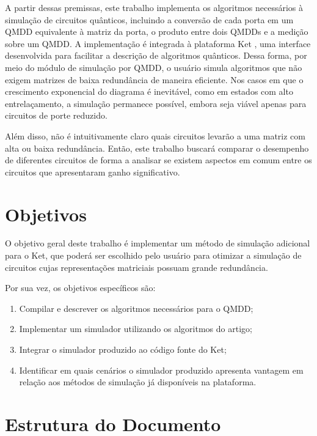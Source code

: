 A partir dessas premissas, este trabalho implementa os algoritmos necessários à simulação de circuitos quânticos, incluindo a conversão de cada porta em um QMDD equivalente à matriz da porta, o produto entre dois QMDDs e a medição sobre um QMDD. A implementação é integrada à plataforma Ket \cite{evandro}, uma interface desenvolvida para facilitar a descrição de algoritmos quânticos. Dessa forma, por meio do módulo de simulação por QMDD, o usuário simula algoritmos que não exigem matrizes de baixa redundância de maneira eficiente. Nos casos em que o crescimento exponencial do diagrama é inevitável, como em estados com alto entrelaçamento, a simulação permanece possível, embora seja viável apenas para circuitos de porte reduzido.

Além disso, não é intuitivamente claro quais circuitos levarão a uma matriz com alta ou baixa redundância. Então, este trabalho buscará comparar o desempenho de diferentes circuitos de forma a analisar se existem aspectos em comum entre os circuitos que apresentaram ganho significativo.

\section{Objetivos}

O objetivo geral deste trabalho é implementar um método de simulação adicional para o Ket, que poderá ser escolhido pelo usuário para otimizar a simulação de circuitos cujas representações matriciais possuam grande redundância.

Por sua vez, os objetivos específicos são:
\begin{enumerate}[label=O\arabic*]
  \item Compilar e descrever os algoritmos necessários para o QMDD;

  \item Implementar um simulador utilizando os algoritmos do artigo;

  \item Integrar o simulador produzido ao código fonte do Ket;

  \item Identificar em quais cenários o simulador produzido apresenta vantagem em relação aos métodos de simulação já disponíveis na plataforma.
\end{enumerate}

\section{Estrutura do Documento}

